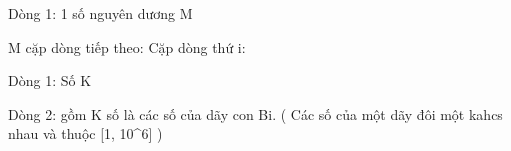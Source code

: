 Dòng 1: 1 số nguyên dương M

M cặp dòng tiếp theo: Cặp dòng thứ i:


Dòng 1: Số K


Dòng 2: gồm K số là các số của dãy con Bi. ( Các số của một dãy đôi một kahcs nhau và thuộc [1, 10^6] )